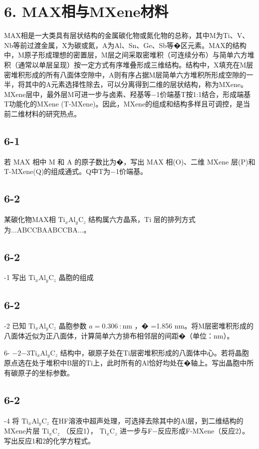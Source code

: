 \section*{6. MAX相与MXene材料}
MAX相是⼀⼤类具有层状结构的⾦属碳化物或氮化物的总称，其中M为Ti、V、Nb等前过渡⾦属，X为碳或氮，A为Al、Sn、Ge、Sb等�区元素。MAX的结构中，M原⼦形成理想的密置层，M层之间采取密堆积（可连续分布）与简单六⽅堆积（通常以单层呈现）按⼀定⽅式有序堆叠形成三维结构。结构中，X填充在M层密堆积形成的所有⼋⾯体空隙中，A则有序占据M层简单六⽅堆积所形成空隙的⼀半，将其中的A元素选择性除去，可以分离得到⼆维的层状结构，称为MXene。MXene层中，最外层M可进⼀步与⻧素、羟基等−1价端基T按1:1结合，形成端基T功能化的MXene (T-MXene)。因此，MXene的组成和结构多样且可调控，是当前⼆维材料的研究热点。

\subsection*{6-1}
若 MAX 相中 M 和 A 的原⼦数⽐为�，写出 MAX 相(O)、⼆维 MXene 层(P)和 T-MXene(Q)的组成通式。Q中T为−1价端基。

\subsection*{6-2}
某碳化物MAX相 $\mathrm { T i } _ { x } \mathrm { A l } _ { y } \mathrm { C } _ { z }$ 结构属六⽅晶系，Ti 层的排列⽅式为...ABCCBAABCCBA...。

\subsection*{6-2}
-1 写出 $\mathrm { T i } _ { x } \mathrm { A l } _ { y } \mathrm { C } _ { z }$ 晶胞的组成

\subsection*{6-2}
-2 已知 $\mathrm { T i } _ { x } \mathrm { A l } _ { y } \mathrm { C } _ { z }$ 晶胞参数 $a = 0 . 3 0 6 \ : \mathrm { n m }$ ，� =1.856 nm。将M层密堆积形成的⼋⾯体近似为正⼋⾯体，计算简单六⽅排布相邻层的间距�（单位：nm）。

6- $- 2 { \mathrm { - } } 3 \mathrm { T i } _ { x } { \mathrm { A l } } _ { y } { \mathrm { C } } _ { z }$ 结构中，碳原⼦处在Ti层密堆积形成的⼋⾯体中⼼。若将晶胞原点选在处于堆积中B层的Ti上，此时所有的Al恰好均处在�轴上。写出晶胞中所有碳原⼦的坐标参数。

\subsection*{6-2}
-4 将 $\mathrm { T i } _ { x } \mathrm { A l } _ { y } \mathrm { C } _ { z }$ 在HF溶液中超声处理，可选择去除其中的Al层，到⼆维结构的MXene⽚层 $\mathrm { T i } _ { x } \mathrm { C } _ { z }$ （反应1）， $\mathrm { T i } _ { x } \mathrm { C } _ { z }$ 进⼀步与F−反应形成F-MXene（反应2）。写出反应1和2的化学⽅程式。


